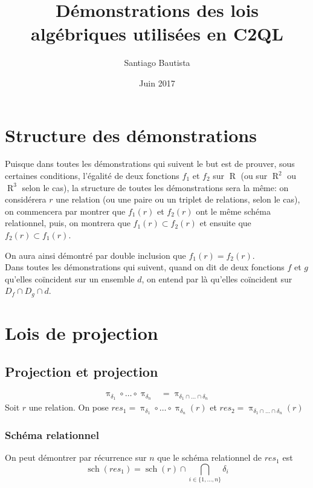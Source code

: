 \documentclass[french]{article}
\DeclareMathOperator{\proj}{\pi}
\DeclareMathOperator{\R}{R}
\DeclareMathOperator{\s}{sch}
\begin{document}
\title{Démonstrations des lois algébriques utilisées en C2QL}
\author{Santiago Bautista}
\date{Juin 2017}
\maketitle

\section*{Structure des démonstrations}
Puisque dans toutes les démonstrations qui suivent le but est 
de prouver, sous certaines conditions, l'égalité de deux fonctions $f_1$ et $f_2$
sur $\R$ (ou sur $\R^2$ ou $\R^3$ selon le cas), 
la structure de toutes les démonstrations sera la même:
on considérera $r$ une relation (ou une paire ou un triplet de relations,
selon le cas),
on commencera par montrer que $f_1(r)$ et 
$f_2(r)$ ont le même schéma relationnel,
puis, on montrera que $f_1(r) \subset f_2(r)$
et ensuite que $f_2(r) \subset f_1(r)$.

On aura ainsi démontré par double inclusion que $f_1(r) = f_2(r)$.\\

Dans toutes les démonstrations qui suivent,
quand on dit de deux fonctions $f$ et $g$ qu'elles coïncident
sur un ensemble $d$, on entend par là qu'elles coïncident sur
$D_f \cap D_g \cap d$.

\section*{Lois de projection}
\subsection*{Projection et projection}
\begin{align}
\proj_{\delta_1}\circ \dots \circ \proj_{\delta_n} 
& = \proj_{\delta_1 \cap \dots \cap \delta_n}
\end{align}
Soit $r$ une relation.
On pose $res_1 = \proj_{\delta_1}\circ \dots \circ \proj_{\delta_n}(r)$ 
et $res_2 =  \proj_{\delta_1 \cap \dots \cap \delta_n}(r)$

\subsubsection*{Schéma relationnel}
On peut démontrer par récurrence sur $n$ que
le schéma relationnel de $res_1$
est 
$$
\s(res_1) = 
\s(r) \cap \bigcap_{i \in \{ 1, \dots, n \} } \delta_i
$$
\end{document}
